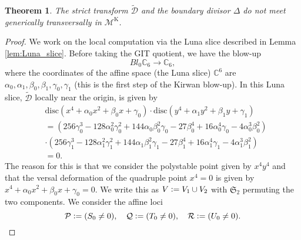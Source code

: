 \documentclass[12pt, pdftex]{amsart}
\theoremstyle{plain}
\newtheorem{thm}{Theorem}[section]
\theoremstyle{definition}
\numberwithin{equation}{section}
\def\C{{\mathbb C}}
\def\SS{{\mathfrak S}}
\def\K{\mathrm{K}}
\def\g{\mathfrak{g}}
\def\M{\mathcal{M}}
\def\D{\mathscr{D}}
\def\PP{\mathcal{P}}
\def\QQ{\mathcal{Q}}
\def\RR{\mathcal{R}}
\def\a{\alpha}
\def\b{\beta}
\def\g{\gamma}
\newcommand{\defeq}{\vcentcolon=}
\begin{document}
\begin{thm}
\label{thm:nonord_nontransversal}
The strict transform $\widetilde{\D}$ and the boundary divisor $\Delta$ 
do not meet generically transversally in $\M^{\K}$.
\end{thm}
\begin{proof}
We work on the local computation via the Luna slice described in Lemma \ref{lem:Luna_slice}.
Before taking the GIT quotient, we have the blow-up
\[Bl_0\C_6\to\C_6,\]
where the coordinates of the affine space (the Luna slice) $\C^6$ are $\a_0, \a_1, \b_0, \b_1, \g_0, \g_1$
(this is the first step of the Kirwan blow-up).
In this Luna slice, $\widetilde{\D}$ locally near the origin, is given by 
\begin{align*}
    &\mathrm{disc}(x^4+\a_0x^2+\b_0x+\g_0)\cdot\mathrm{disc}(y^4+\a_1y^2+\b_1y+\g_1)\\
    &=(256\g_0^3-128\a_0^2\g_0^2+144\a_0\b_0^2\g_0-27\b_0^4+16\a_0^4\g_0-4\a_0^3\b_0^2)\\
    &\cdot (256\g_1^3-128\a_1^2\g_1^2+144\a_1\b_1^2\g_1-27\b_1^4+16\a_1^4\g_1-4\a_1^3\b_1^2)\\
    &=0.
\end{align*}
The reason for this is that we consider the polystable point given by $x^4y^4$ and that the versal deformation of the quadruple point $x^4=0$ is given by $x^4+\a_0x^2+\b_0x+\g_0=0$.
We write this as  $V\defeq V_1\cup V_2$ with $\SS_2$ permuting the two components.
We consider the affine loci 
\[\PP\defeq(S_0\neq 0),\quad \QQ\defeq(T_0\neq 0),\quad \RR\defeq(U_0\neq 0).\]


\end{proof}
\end{document}
